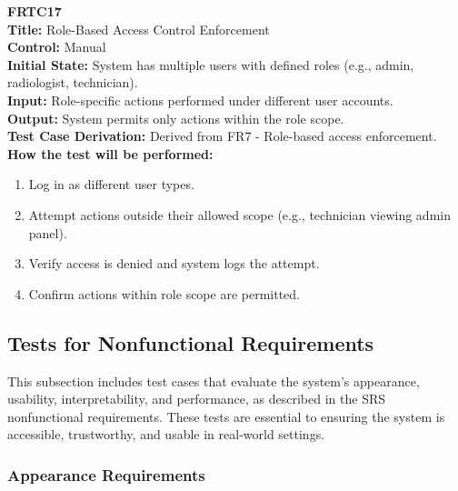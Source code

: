 \documentclass[12pt, titlepage]{article}
\begin{document}
\vspace{1em}

\textbf{FRTC17}\\
\textbf{Title:} Role-Based Access Control Enforcement\\
\textbf{Control:} Manual\\
\textbf{Initial State:} System has multiple users with defined roles (e.g., admin, radiologist, technician).\\
\textbf{Input:} Role-specific actions performed under different user accounts.\\
\textbf{Output:} System permits only actions within the role scope.\\
\textbf{Test Case Derivation:} Derived from FR7 - Role-based access enforcement.\\
\textbf{How the test will be performed:}
\begin{enumerate}
  \item Log in as different user types.
  \item Attempt actions outside their allowed scope (e.g., technician viewing admin panel).
  \item Verify access is denied and system logs the attempt.
  \item Confirm actions within role scope are permitted.
\end{enumerate}

\vspace{1em}

\subsection{Tests for Nonfunctional Requirements}


This subsection includes test cases that evaluate the system's appearance, usability, interpretability, and performance, as described in the SRS nonfunctional requirements. These tests are essential to ensuring the system is accessible, trustworthy, and usable in real-world settings.

\subsubsection{Appearance Requirements}
\end{document}
